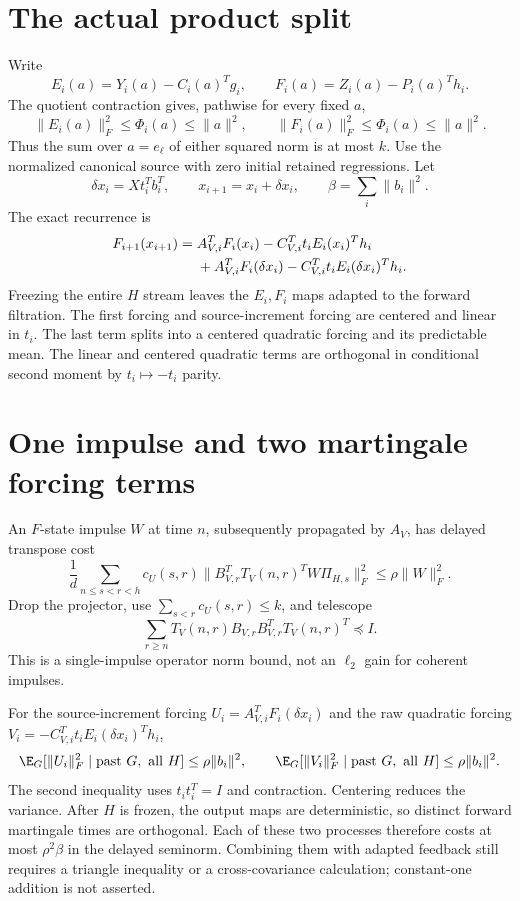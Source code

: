 \documentclass[11pt,oneside,openany,a4paper]{book}
\numberwithin{equation}{chapter}
\theoremstyle{definition}
\theoremstyle{remark}
\begin{document}
\section{The actual product split}
Write
\[
 E_i(a)=Y_i(a)-C_i(a)^Tg_i,
 \qquad F_i(a)=Z_i(a)-P_i(a)^Th_i.
\]
The quotient contraction gives, pathwise for every fixed $a$,
\[
 \|E_i(a)\|_F^2\le\Phi_i(a)\le\|a\|^2,
 \qquad \|F_i(a)\|_F^2\le\Phi_i(a)\le\|a\|^2.
\]
Thus the sum over $a=e_\ell$ of either squared norm is at most $k$. Use the normalized canonical source with zero initial retained regressions. Let
\[
 \delta x_i=Xt_i^Tb_i^T,\qquad x_{i+1}=x_i+\delta x_i,
 \qquad\beta=\sum_i\|b_i\|^2.
\]
The exact recurrence is
\begin{align}\label{crossfeedback:eq:product}
 F_{i+1}(x_{i+1})={}&A_{V,i}^TF_i(x_i)
 -C_{V,i}^Tt_iE_i(x_i)^Th_i\notag\\
 &+A_{V,i}^TF_i(\delta x_i)
 -C_{V,i}^Tt_iE_i(\delta x_i)^Th_i.
\end{align}
Freezing the entire $H$ stream leaves the $E_i,F_i$ maps adapted to the forward filtration. The first forcing and source-increment forcing are centered and linear in $t_i$. The last term splits into a centered quadratic forcing and its predictable mean. The linear and centered quadratic terms are orthogonal in conditional second moment by $t_i\mapsto-t_i$ parity.

\section{One impulse and two martingale forcing terms}
An $F$-state impulse $W$ at time $n$, subsequently propagated by $A_V$, has delayed transpose cost
\[
 \frac1d\sum_{n\le s<r<h}c_U(s,r)
 \|B_{V,r}^TT_V(n,r)^TW\Pi_{H,s}\|_F^2
 \le\rho\|W\|_F^2.
\]
Drop the projector, use $\sum_{s<r}c_U(s,r)\le k$, and telescope
\[
 \sum_{r\ge n}T_V(n,r)B_{V,r}B_{V,r}^TT_V(n,r)^T\preceq I.
\]
This is a single-impulse operator norm bound, not an $\ell_2$ gain for coherent impulses.

For the source-increment forcing $U_i=A_{V,i}^TF_i(\delta x_i)$ and the raw quadratic forcing $V_i=-C_{V,i}^Tt_iE_i(\delta x_i)^Th_i$,
\[
 \E_G[\|U_i\|_F^2\mid\text{past }G,\text{ all }H]\le\rho\|b_i\|^2,
 \qquad
 \E_G[\|V_i\|_F^2\mid\text{past }G,\text{ all }H]\le\rho\|b_i\|^2.
\]
The second inequality uses $t_it_i^T=I$ and contraction. Centering reduces the variance. After $H$ is frozen, the output maps are deterministic, so distinct forward martingale times are orthogonal. Each of these two processes therefore costs at most $\rho^2\beta$ in the delayed seminorm. Combining them with adapted feedback still requires a triangle inequality or a cross-covariance calculation; constant-one addition is not asserted.
\end{document}
